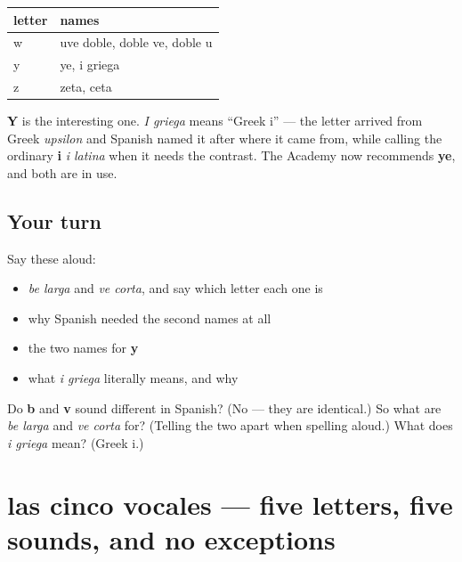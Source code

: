 \begin{grammarlens}[title={Grammar Lens: the other letters with two names}]
\noindent
\begin{tabularx}{\linewidth}{@{}>{\raggedright\arraybackslash}X>{\raggedright\arraybackslash}X@{}}
\toprule
\textbf{letter} & \textbf{names} \\
\midrule
w & uve doble, doble ve, doble u \\
y & ye, i griega \\
z & zeta, ceta \\
\bottomrule
\end{tabularx}

\textbf{Y} is the interesting one. \emph{I griega} means \textquotedblleft{}Greek i\textquotedblright{} — the letter arrived from Greek \emph{upsilon} and Spanish named it after where it came from, while calling the ordinary \textbf{i} \emph{i latina} when it needs the contrast. The Academy now recommends \textbf{ye}, and both are in use.
\end{grammarlens}

\subsection*{Your turn}
Say these aloud:

\begin{itemize}
\raggedright
  \item \emph{be larga} and \emph{ve corta}, and say which letter each one is
  \item why Spanish needed the second names at all
  \item the two names for \textbf{y}
  \item what \emph{i griega} literally means, and why
\end{itemize}

\begin{tcolorbox}[breakable,colback=teal!4,colframe=teal!35!black,title={Before you move on}]
Do \textbf{b} and \textbf{v} sound different in Spanish? (No — they are identical.) So what are \emph{be larga} and \emph{ve corta} for? (Telling the two apart when spelling aloud.) What does \emph{i griega} mean? (Greek i.)
\end{tcolorbox}
\section[las cinco vocales]{las cinco vocales — five letters, five sounds, and no exceptions}

\label{lesson:ES-C425-vocales}



